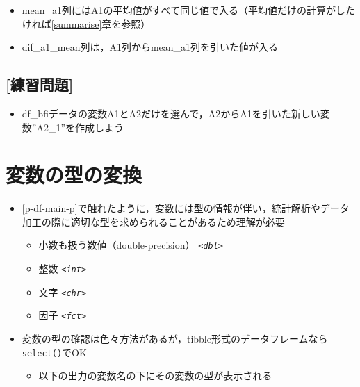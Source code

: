 \documentclass[
  xelatex,ja=standard, b5paper]{bxjsbook}
\providecommand{\tightlist}{%
  \setlength{\itemsep}{0pt}\setlength{\parskip}{0pt}}
\begin{document}
\begin{itemize}
\tightlist
\item
  mean\_a1列にはA1の平均値がすべて同じ値で入る（平均値だけの計算がしたければ\ref{summarise}章を参照）
\item
  dif\_a1\_mean列は，A1列からmean\_a1列を引いた値が入る
\end{itemize}

\hypertarget{ux7df4ux7fd2ux554fux984c-9}{%
\subsection{{[}練習問題{]}}\label{ux7df4ux7fd2ux554fux984c-9}}

\begin{itemize}
\tightlist
\item
  df\_bfiデータの変数A1とA2だけを選んで，A2からA1を引いた新しい変数''A2\_1''を作成しよう
\end{itemize}

\hypertarget{mu-kata}{%
\section{変数の型の変換}\label{mu-kata}}

\begin{itemize}
\tightlist
\item
  \ref{p-df-main-p}で触れたように，変数には型の情報が伴い，統計解析やデータ加工の際に適切な型を求められることがあるため理解が必要

  \begin{itemize}
  \tightlist
  \item
    小数も扱う数値（double-precision） \emph{\texttt{\textless{}dbl\textgreater{}}}
  \item
    整数 \emph{\texttt{\textless{}int\textgreater{}}}
  \item
    文字 \emph{\texttt{\textless{}chr\textgreater{}}}
  \item
    因子 \emph{\texttt{\textless{}fct\textgreater{}}}
  \end{itemize}
\item
  変数の型の確認は色々方法があるが，tibble形式のデータフレームなら\texttt{select()}でOK

  \begin{itemize}
  \tightlist
  \item
    以下の出力の変数名の下にその変数の型が表示される
  \end{itemize}
\end{itemize}
\end{document}
